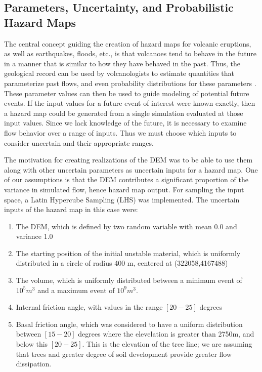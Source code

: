 \documentclass[a4paper,fleqn]{article}
\begin{document}

\subsection {Parameters, Uncertainty, and Probabilistic Hazard Maps}

The central concept guiding the creation of hazard maps for volcanic
eruptions, as well as earthquakes, floods, etc., is that volcanoes
tend to behave in the future in a manner that is similar to how they
have behaved in the past. Thus, the geological record can be used by
volcanologists to estimate quantities that parameterize past flows,
and even probability distributions for these parameters
\citep{dalbeyjgr,dalbeythesis}.  These parameter values can then be
used to guide modeling of potential future events.  If the input
values for a future event of interest were known exactly, then a
hazard map could be generated from a single simulation evaluated at
those input values. Since we lack knowledge of the future, it is
necessary to examine flow behavior over a range of inputs. Thus we
must choose which inputs to consider uncertain and their appropriate
ranges.

The motivation for creating realizations of the DEM was to be able to
use them along with other uncertain parameters as uncertain inputs for
a hazard map.  One of our assumptions is that the DEM contributes a
significant proportion of the variance in simulated flow, hence hazard
map output.  For sampling the input space, a Latin Hypercube Sampling
(LHS) was implemented.  The uncertain inputs of the hazard map in this
case were:
\begin{enumerate}
\item The DEM, which is
defined by two random variable with mean 0.0 and variance 1.0
\item The starting position of the initial unstable material, which is
uniformly distributed in a circle of radius 400 m, centered at
(322058,4167488)
\item The volume, which is uniformly distributed between a minimum
event of $10^5 m^3$ and a maximum event of $10^9 m^3$. 
\item  Internal friction angle, with values
in the range $[20 - 25]$ degrees
\item Basal friction angle, which was considered to have a uniform
distribution between $[15 - 20]$ degrees where the elevelation is
greater than 2750m, and below this $ [20 - 25]$.  This is the
elevation of the tree line; we are assuming that trees and greater
degree of soil development provide greater flow dissipation.
\end{enumerate}
\end{document}
